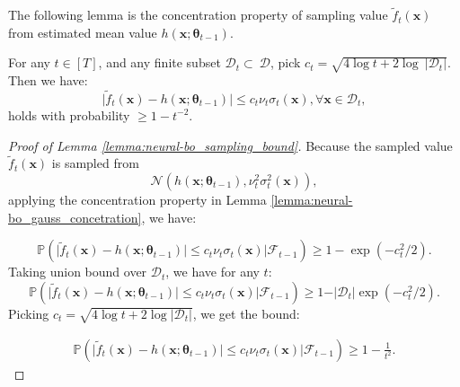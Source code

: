 The following lemma is the concentration property of sampling value $\widetilde{f}_t(\mathbf{x})$ from estimated mean value $h(\mathbf{x}; \boldsymbol{\theta}_{t-1})$.
\begin{lemma}
\label{lemma:neural-bo_sampling_bound}
For any $t \in [T]$, and any finite subset $\mathcal{D}_t \subset\ \mathcal{D}$,  pick $c_t =  \sqrt{4\log t + 2 \log \ \lvert \mathcal D_t \rvert}$. Then we have:  
\[\lvert \widetilde{f}_t(\mathbf{x}) - h(\mathbf{x}; \boldsymbol{\theta}_{t-1}) \rvert \leq c_t\nu_t \sigma_t(\mathbf{x}), \forall \mathbf{x} \in \mathcal{D}_t, \] 
holds with probability $\geq  1-t^{-2}$.
\end{lemma}


\begin{proof}[Proof of Lemma \ref{lemma:neural-bo_sampling_bound}]
    
Because the sampled value $\widetilde{f}_t(\mathbf{x})$ is sampled from  
\[
\mathcal{N}(h(\mathbf{x}; \boldsymbol{\theta}_{t-1}), \nu_t^2\sigma_t^2(\mathbf{x})),
\] 
applying the concentration property in Lemma \ref{lemma:neural-bo_gauss_concetration}, we have:

\[\mathbb{P}(\rvert \widetilde{f}_t(\mathbf{x}) -h(\mathbf{x}; \boldsymbol{\theta}_{t-1}) \lvert \leq c_t \nu_t \sigma_t(\mathbf{x}) \lvert \mathcal{F}_{t-1}) \geq 1-\exp(-c_t^2/2).
\]
Taking union bound over $\mathcal{D}_t$, we have for any $t$:
\[\mathbb{P}(\rvert \widetilde{f}_t(\mathbf{x}) - h(\mathbf{x}; \boldsymbol{\theta}_{t-1}) \lvert \leq c_t \nu_t \sigma_t(\mathbf{x}) \lvert \mathcal{F}_{t-1}) \geq 1-\rvert \mathcal{D}_t \rvert\exp(-c_t^2/2). \]
Picking $c_t = \sqrt{4 \log t + 2 \log \lvert \mathcal{D}_t \rvert}$, we get the bound:

 \begin{align*}
     \mathbb{P}(\rvert \widetilde{f}_t(\mathbf{x}) - h(\mathbf{x}; \boldsymbol{\theta}_{t-1}) \lvert \leq c_t \nu_t \sigma_t(\mathbf{x}) \lvert \mathcal{F}_{t-1}) \geq 1-\frac{1}{t^2}.
 \end{align*}
\end{proof}

